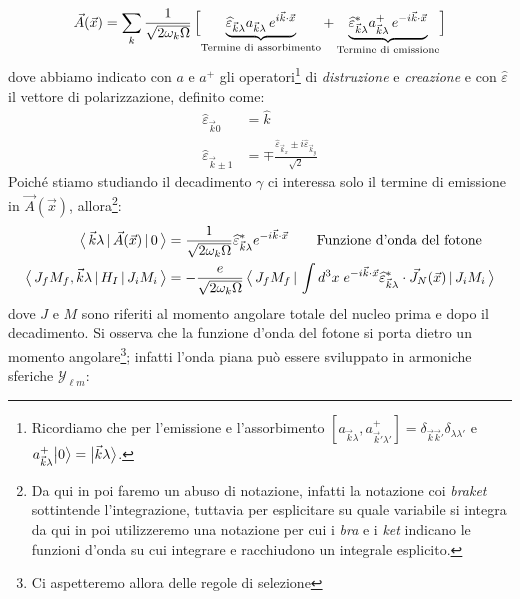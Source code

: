 $$\vec{A}(\vec{x}) = \sum_k \frac{1}{\sqrt{2\omega_k\Omega}}\, \Bigl [ \underbrace{\widehat{\varepsilon}_{\vec{k}\lambda} a_{\vec{k}\lambda}\, e^{i\vec{k}\cdot\vec{x}}}_\text{Termine di assorbimento} + \underbrace{\widehat{\varepsilon}_{\vec{k}\lambda}^* a_{\vec{k}\lambda}^+\, e^{-i\vec{k}\cdot\vec{x}}}_\text{Termine di emissione}  \Bigr ]$$
dove abbiamo indicato con $a$ e $a^+$ gli operatori\footnote{Ricordiamo che per l'emissione e l'assorbimento $[a_{\vec{k}\lambda},a_{\vec{k}'\lambda'}^+] = \delta_{\vec{k}\vec{k}'}\delta_{\lambda\lambda'}$ e $a^+_{\vec{k}\lambda} \bigl | 0 \bigr \rangle = \bigl | \vec{k}\lambda \bigr \rangle$.} di \textit{distruzione} e \textit{creazione} e con $\widehat{\varepsilon}$ il vettore di polarizzazione, definito come:
\begin{displaymath}
\begin{aligned}
\widehat{\varepsilon}_{\vec{k}0} &= \widehat{k} \\
\widehat{\varepsilon}_{\vec{k}\pm 1} &= \mp \frac{\widehat{\varepsilon}_{\vec{k}_x}\pm i\widehat{\varepsilon}_{\vec{k}_y}}{\sqrt{2}}
\end{aligned}
\end{displaymath}
Poiché stiamo studiando il decadimento $\gamma$ ci interessa solo il termine di emissione in $\vec{A}(\vec{x})$, allora\footnote{Da qui in poi faremo un abuso di notazione, infatti la notazione coi \textit{braket} sottintende l'integrazione, tuttavia per esplicitare su quale variabile si integra da qui in poi utilizzeremo una notazione per cui i \textit{bra} e i \textit{ket} indicano le funzioni d'onda su cui integrare e racchiudono un integrale esplicito.}:
\begin{displaymath}
\begin{aligned}
\oss{\vec{k}\lambda}{\vec{A}(\vec{x})}{0} &= \frac{1}{\sqrt{2\omega_k\Omega}} \widehat{\varepsilon}^*_{\vec{k}\lambda} e^{-i\vec{k}\cdot\vec{x}}\qquad \text{Funzione d'onda del fotone} \\
%
\oss{J_f M_f,\vec{k}\lambda}{H_I}{J_i M_i} &= - \frac{e}{\sqrt{2\omega_k\Omega}} \, \oss{J_f M_f}{\int d^3x \; e^{-i\vec{k}\cdot\vec{x}}\widehat{\varepsilon}^*_{\vec{k}\lambda}\cdot\vec{J}_N (\vec{x})}{J_i M_i}
\end{aligned}
\end{displaymath}
dove $J$ e $M$ sono riferiti al momento angolare totale del nucleo prima e dopo il decadimento.
Si osserva che la funzione d'onda del fotone si porta dietro un momento angolare\footnote{Ci aspetteremo allora delle regole di selezione}; infatti l'onda piana può essere sviluppato in armoniche sferiche $\mathcal{Y}_{\ell m}$:
